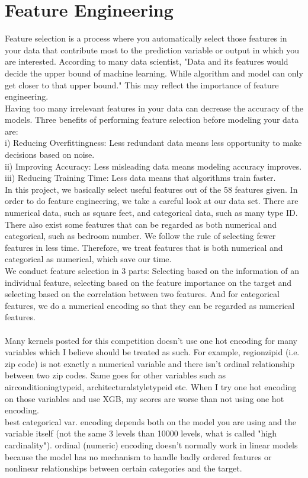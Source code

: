 \documentclass[conference]{IEEEtran}
\begin{document}
\section{Feature Engineering}\label{iv}
\indent Feature selection is a process where you automatically select those features in your data that contribute most to the prediction variable or output in which you are interested. According to many data scientist, "Data and its features would decide the upper bound of machine learning. While algorithm and model can only get closer to that upper bound." This may reflect the importance of feature engineering.\\
\indent Having too many irrelevant features in your data can decrease the accuracy of the models. Three benefits of performing feature selection before modeling your data are: \\
\indent i) Reducing Overfittingness: Less redundant data means less opportunity to make decisions based on noise. \\ 
\indent ii) Improving Accuracy: Less misleading data means modeling accuracy improves. \\
\indent iii) Reducing Training Time: Less data means that algorithms train faster. \\
\indent In this project, we basically select useful features out of the 58 features given. In order to do feature engineering, we take a careful look at our data set. There are numerical data, such as square feet,  and categorical data, such as many type ID. There also exist some features that can be regarded as both numerical and categorical, such as bedroom number. We follow the rule of selecting fewer features in less time. Therefore, we treat features that is both numerical and categorical as numerical, which save our time. \\
\indent We conduct feature selection in 3 parts: Selecting based on the information of an individual feature, selecting based on the feature importance on the target and selecting based on the correlation between two features.  And for categorical features, we do a numerical encoding so that they can be regarded as numerical features. \\
\indent \\
\indent Many kernels posted for this competition doesn't use one hot encoding for many variables which I believe should be treated as such. For example, regionzipid (i.e. zip code) is not exactly a numerical variable and there isn't ordinal relationship between two zip codes. Same goes for other variables such as airconditioningtypeid, architecturalstyletypeid etc. When I try one hot encoding on those variables and use XGB, my scores are worse than not using one hot encoding. \\
\indent best categorical var. encoding depends both on the model you are using and the variable itself (not the same 3 levels than 10000 levels, what is called "high cardinality"). ordinal (numeric) encoding doesn't normally work in linear models because the model has no mechanism to handle badly ordered features or nonlinear relationships between certain categories and the target.\\
%
\end{document}
